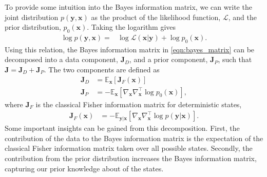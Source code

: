 \documentclass{article}
\renewcommand{\vec}[1]{\ensuremath{{\boldsymbol #1}}}
\newcommand{\mat}[1]{\ensuremath{\boldsymbol{#1}}}
\begin{document}
To provide some intuition into the Bayes information matrix, we can write the joint distribution $p(\mathbf{y},\mathbf{x})$ as the product of the likelihood function, $\mathcal L$, and the prior distribution, $p_0(\mathbf{x})$. Taking the logarithm gives
\begin{align}
	\log p(\mathbf{y},\mathbf{x}) =& \log\mathcal{L}(\mathbf{x}|\mathbf{y}) + \log p_0(\mathbf{x}).
\end{align}
Using this relation, the Bayes information matrix in \eqref{eqn:bayes_matrix} can be decomposed into a data component, $\mathbf{J}_D$, and a prior component, $\mathbf{J}_P$, such that $\mathbf{J} = \mathbf{J}_D + \mathbf{J}_P$.
The two components are defined as
\begin{align}
	\mathbf{J}_D &= \mathbb E_{\mathbf{x}}\left[ \mathbf{J}_F(\mathbf{x}) \right]  \\
	\mathbf{J}_P &= -\mathbb E_{\mathbf{x}}\left[ \nabla_{\mathbf{x}}\nabla_{\mathbf{x}}^{\top} \log p_0(\mathbf{x}) \right],
\end{align}
where $\mathbf{J}_F$ is the classical Fisher information matrix for deterministic states,
\begin{align}
	\mat J_F(\vec x) &= -\mathbb E_{\vec y| \vec x}\left[ \nabla_{\vec x}\nabla_{\vec x}^\top \log p(\vec y|\vec x) \right].
\end{align}
Some important insights can be gained from this decomposition. First, the contribution of the data to the Bayes information matrix is the expectation of the classical Fisher information matrix taken over all possible states. Secondly, the contribution from the prior distribution increases the Bayes information matrix, capturing our prior knowledge about of the states.
\end{document}

